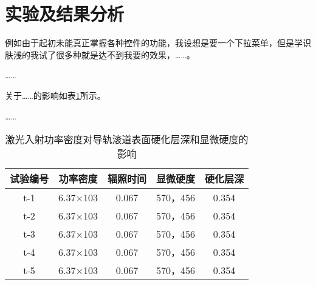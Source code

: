 \documentclass[../../main.tex]{subfiles}
\begin{document}



\section{实验及结果分析}
例如由于起初未能真正掌握各种控件的功能，我设想是要一个下拉菜单，但是学识肤浅的我试了很多种就是达不到我要的效果，……。

……

关于……的影响如表\ref{tab:example0}所示。

……

\begin{table}[htbp]
        \small
        \newcommand{\tabincell}[2]{\begin{tabular}{@{}#1@{}}#2\end{tabular}}
        \centering
        \caption{激光入射功率密度对导轨滚道表面硬化层深和显微硬度的影响}
        \begin{tabular}{ccccc}
                \toprule
                试验编号 & 功率密度 & 辐照时间 & 显微硬度       & 硬化层深\\ \midrule
                t-1     &6.37×103       &0.067  &570，456        &0.354\\
                t-2     &6.37×103       &0.067  &570，456        &0.354\\
                t-3     &6.37×103       &0.067  &570，456        &0.354\\
                t-4     &6.37×103       &0.067  &570，456        &0.354\\
                t-5     &6.37×103       &0.067  &570，456        &0.354\\ \bottomrule
        \end{tabular}
        \label{tab:example0}
\end{table}


\begin{table}
\end{table}
\end{document}
